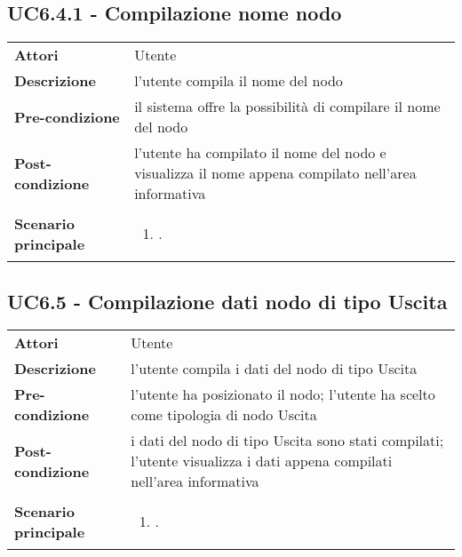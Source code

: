 \subsection{UC6.4.1 - Compilazione nome nodo} 
\label{sssec:UC6.4.1} 
\def\arraystretch{1.5}
\begin{tabularx}{\textwidth}{l|p{}}
	\rowcolor{I} \multicolumn{2}{c}{\color{white}\textbf{UC6.4.1 - Compilazione nome nodo}} \\
	\toprule
	\endhead
	\textbf{Attori} & Utente\\
	\textbf{Descrizione} & l'utente compila il nome del nodo\\
	\textbf{Pre-condizione} & il sistema offre la possibilità di compilare il nome del nodo\\
	\textbf{Post-condizione} & l'utente ha compilato il nome del nodo e visualizza il nome appena compilato nell'area informativa\\
	\textbf{Scenario principale} & \vspace{-1.2em}\begin{enumerate}[leftmargin=*,noitemsep,nosep]
		\item \nameref{sssec:UC6.4.1}.
	\end{enumerate}\\
	\bottomrule
\end{tabularx}
\subsection{UC6.5 - Compilazione dati nodo di tipo Uscita} 
\label{sssec:UC6.5} 
\def\arraystretch{1.5}
\begin{tabularx}{\textwidth}{l|p{}}
	\rowcolor{I} \multicolumn{2}{c}{\color{white}\textbf{UC6.5 - Compilazione dati nodo di tipo Uscita}} \\
	\toprule
	\endhead
	\textbf{Attori} & Utente\\
	\textbf{Descrizione} & l'utente compila i dati del nodo di tipo Uscita\\
	\textbf{Pre-condizione} & l'utente ha posizionato il nodo; l'utente ha scelto come tipologia di nodo Uscita\\
	\textbf{Post-condizione} & i dati del nodo di tipo Uscita sono stati compilati; l'utente visualizza i dati appena compilati nell'area informativa\\
	\textbf{Scenario principale} & \vspace{-1.2em}\begin{enumerate}[leftmargin=*,noitemsep,nosep]
		\item \nameref{sssec:UC6.5}.
	\end{enumerate}\\
	\bottomrule
\end{tabularx}
